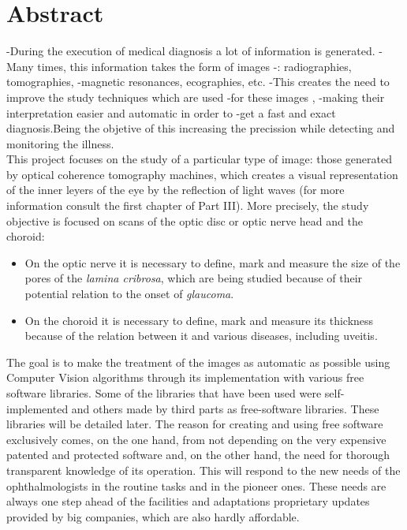 \newpage

\section*{Abstract}
-During the execution of medical diagnosis a lot of information is generated.
-Many times, this information takes the form of images
-\emph{\citep*[1. The Analysis of Medical Images, 2. Digital Image
-  Acquisition]{toennies2012guide}}: radiographies, tomographies,
-magnetic resonances, ecographies, etc.
-This creates the need to improve the study techniques which are used
-for these images \emph{\citep*[4. Image Enhancement]{toennies2012guide}},
-making their interpretation easier and automatic in order to
-get a fast and exact diagnosis.Being the objetive of this increasing the 
precission while detecting and monitoring the illness.\\
This project focuses on the study of a particular type of image: those
generated by optical coherence tomography machines, which creates a
visual representation of the inner leyers of the eye by the reflection
of light waves (for more information consult the first chapter of Part
III). More precisely, the study objective is focused on scans of the
optic disc or optic nerve head and the choroid:
\begin{itemize}
\item On the optic nerve it is necessary to define, mark and measure
  the size of the pores of the \emph{lamina cribrosa}, which are being
  studied because of their potential relation to the onset of \emph{glaucoma}.
\item On the choroid it is necessary to define, mark and measure its
  thickness because of the relation between it and various diseases, including uveitis.
\end{itemize}
The goal is to make the treatment of the images as automatic as
possible using Computer Vision algorithms through its implementation
with various free software libraries. Some of the libraries that have
been used were self-implemented and others made by third parts as
free-software libraries. These libraries will be detailed later. The
reason for creating and using free software exclusively comes, on the
one hand, from not depending on the very expensive patented and protected
software and, on the other hand, the need for thorough transparent
knowledge of its operation. This will respond to the new needs of the
ophthalmologists in the routine tasks and in the pioneer ones. These needs 
are always one step ahead of the
facilities and adaptations proprietary updates provided by big
companies, which are also hardly affordable.
